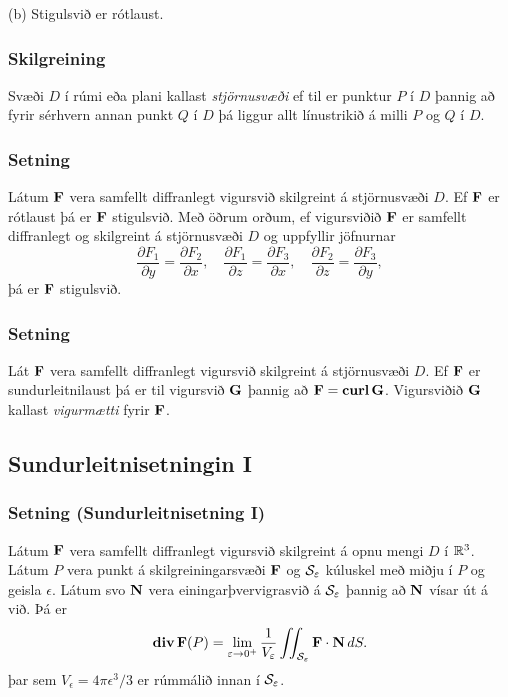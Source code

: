 (b) Stigulsvið er rótlaust.

   \medskip



\subsubsection{Skilgreining \rtask{}}
  Svæði $D$ í rúmi eða plani kallast {\em
  stjörnusvæði} ef til er punktur $P$ í $D$ þannig að fyrir sérhvern
annan punkt $Q$ í $D$ þá liggur allt línustrikið á milli $P$ og $Q$ í
$D$. 




\subsubsection{Setning \rtask{}}
Látum $\Fv$ vera samfellt diffranlegt vigursvið
skilgreint á stjörnusvæði $D$.  Ef $\Fv$ er rótlaust þá er $\Fv$
stigulsvið.  Með öðrum orðum, ef vigursviðið  $\Fv$ er samfellt
diffranlegt og skilgreint á stjörnusvæði $D$ og uppfyllir jöfnurnar
$$\frac{\partial F_1}{\partial y}=
\frac{\partial F_2}{\partial x},\quad
\frac{\partial F_1}{\partial z}=
\frac{\partial F_3}{\partial x},\quad
\frac{\partial F_2}{\partial z}=
\frac{\partial F_3}{\partial y},$$
þá er $\Fv$ stigulsvið.


\subsubsection{Setning \rtask{}}
 Lát $\Fv$ vera samfellt diffranlegt vigursvið skilgreint á stjörnusvæði $D$.  Ef $\Fv$ er sundurleitnilaust þá er til vigursvið $\Gv$ þannig að $\Fv=\curl\Gv$.  Vigursviðið $\Gv$ kallast {\em vigurmætti} fyrir $\Fv$.




\subsection{Sundurleitnisetningin I} 

\subsubsection{Setning \rtask{} (Sundurleitnisetning I)}
 Látum $\Fv$ vera samfellt
diffranlegt vigursvið skilgreint á opnu mengi $D$ í $\R^3$.    Látum
$P$ vera punkt á skilgreiningarsvæði $\Fv$ og ${\cal S}_\epsilon$
kúluskel með miðju í $P$ og geisla $\epsilon$.  Látum svo $\Nv$ vera
einingarþvervigrasvið á ${\cal S}_\epsilon$ þannig að $\Nv$ vísar út á
við.  Þá er 
$$\dive \Fv(P)=\lim_{\epsilon\rightarrow 0^+}
\frac{1}{V_\epsilon}\tvint_{{\cal S}_\epsilon}\Fv\cdot\Nv\,dS.$$
þar sem $V_\epsilon = 4\pi\epsilon^3/3$ er rúmmálið innan í ${\cal S}_\epsilon$.



